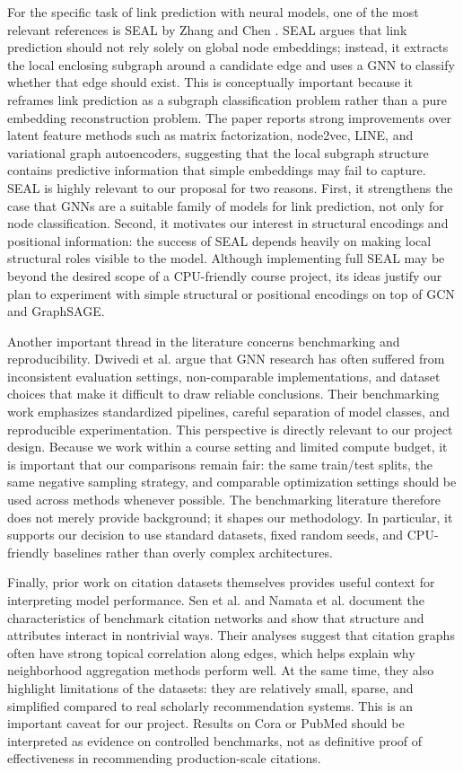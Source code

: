 \documentclass[11pt,a4paper]{article}
\begin{document}
For the specific task of link prediction with neural models,
one of the most relevant references is SEAL by Zhang and Chen \cite{zhang2018link}.
SEAL argues that link prediction should not rely solely on global node embeddings;
instead, it extracts the local enclosing subgraph around a candidate edge
and uses a GNN to classify whether that edge should exist.
This is conceptually important because it reframes link prediction
as a subgraph classification problem rather than a pure embedding reconstruction problem.
The paper reports strong improvements over latent feature methods such as
matrix factorization, node2vec, LINE, and variational graph autoencoders,
suggesting that the local subgraph structure contains predictive information
that simple embeddings may fail to capture.
SEAL is highly relevant to our proposal for two reasons.
First, it strengthens the case that GNNs are a suitable family of models for link prediction,
not only for node classification.
Second, it motivates our interest in structural encodings and positional information:
the success of SEAL depends heavily on making local structural roles visible to the model.
Although implementing full SEAL may be beyond the desired scope of a CPU-friendly course project,
its ideas justify our plan to experiment with simple structural or positional encodings
on top of GCN and GraphSAGE.

Another important thread in the literature concerns benchmarking and reproducibility.
Dwivedi et al. \cite{dwivedi2023benchmarking} argue that GNN research has often suffered
from inconsistent evaluation settings, non-comparable implementations,
and dataset choices that make it difficult to draw reliable conclusions.
Their benchmarking work emphasizes standardized pipelines,
careful separation of model classes, and reproducible experimentation.
This perspective is directly relevant to our project design.
Because we work within a course setting and limited compute budget,
it is important that our comparisons remain fair:
the same train/test splits, the same negative sampling strategy,
and comparable optimization settings should be used across methods whenever possible.
The benchmarking literature therefore does not merely provide background;
it shapes our methodology.
In particular, it supports our decision to use standard datasets,
fixed random seeds, and CPU-friendly baselines rather than overly complex architectures.

Finally, prior work on citation datasets themselves provides useful context
for interpreting model performance.
Sen et al. \cite{sen2008collective} and Namata et al. \cite{namata2012query}
document the characteristics of benchmark citation networks
and show that structure and attributes interact in nontrivial ways.
Their analyses suggest that citation graphs often have strong topical correlation along edges,
which helps explain why neighborhood aggregation methods perform well.
At the same time, they also highlight limitations of the datasets:
they are relatively small, sparse, and simplified compared to real scholarly recommendation systems.
This is an important caveat for our project.
Results on Cora or PubMed should be interpreted as evidence on controlled benchmarks,
not as definitive proof of effectiveness in recommending production-scale citations.
\end{document}
